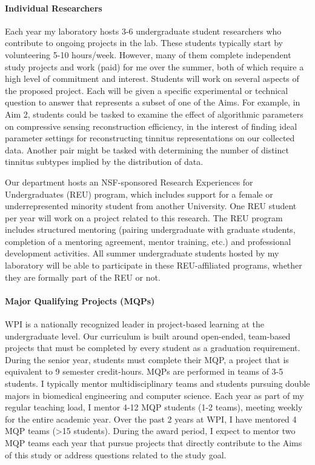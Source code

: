 \documentclass[11pt, notitlepage]{article} %
\begin{document}
\paragraph{Individual Researchers}
Each year my laboratory hosts 3-6 undergraduate student researchers who contribute to ongoing projects in the lab. These students typically start by volunteering 5-10 hours/week. However, many of them complete independent study projects and work (paid) for me over the summer, both of which require a high level of commitment and interest. Students will work on several aspects of the proposed project. Each will be given a specific experimental or technical question to answer that represents a subset of one of the Aims. For example, in Aim 2, students could be tasked to examine the effect of algorithmic parameters on compressive sensing reconstruction efficiency, in the interest of finding ideal parameter settings for reconstructing tinnitus representations on our collected data. Another pair might be tasked with determining the number of distinct tinnitus subtypes implied by the distribution of data.
     
Our department hosts an NSF-sponsored Research Experiences for Undergraduates (REU) program, which includes support for a female or underrepresented minority student from another University. One REU student per year will work on a project related to this research. The REU program includes structured mentoring (pairing undergraduate with graduate students, completion of a mentoring agreement, mentor training, etc.) and professional development activities. All summer undergraduate students hosted by my laboratory will be able to participate in these REU-affiliated programs, whether they are formally part of the REU or not.

\paragraph{Major Qualifying Projects (MQPs)}
WPI is a nationally recognized leader in project-based learning at the undergraduate level. Our curriculum is built around open-ended, team-based projects that must be completed by every student as a graduation requirement. During the senior year, students must complete their MQP, a project that is equivalent to 9 semester credit-hours. MQPs are performed in teams of 3-5 students.
I typically mentor multidisciplinary teams and students pursuing double majors in biomedical engineering and computer science. Each year as part of my regular teaching load, I mentor 4-12 MQP students (1-2 teams), meeting weekly for the entire academic year. Over the past 2 years at WPI, I have mentored 4 MQP teams (>15 students). During the award period, I expect to mentor two MQP teams each year that pursue projects that directly contribute to the Aims of this study or address questions related to the study goal.
\end{document}
